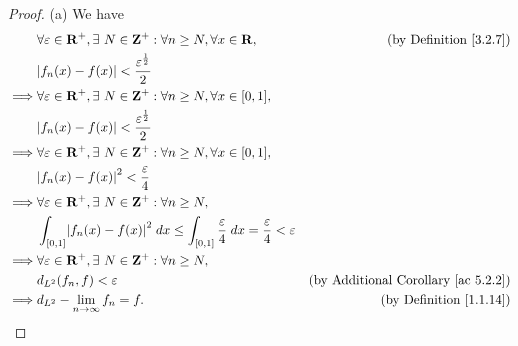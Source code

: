 \begin{proof}{(a)}
    We have
    \begin{align*}
                 & \forall \varepsilon \in \mathbf{R}^+, \exists\ N \in \mathbf{Z}^+ : \forall n \geq N, \forall x \in \mathbf{R},                 & \text{(by Definition \ref{3.2.7})}              \\
                 & \abs*{f_n(x) - f(x)} < \frac{\varepsilon^{\frac{1}{2}}}{2}                                                                                                                        \\
        \implies & \forall \varepsilon \in \mathbf{R}^+, \exists\ N \in \mathbf{Z}^+ : \forall n \geq N, \forall x \in [0, 1],                                                                       \\
                 & \abs*{f_n(x) - f(x)} < \frac{\varepsilon^{\frac{1}{2}}}{2}                                                                                                                        \\
        \implies & \forall \varepsilon \in \mathbf{R}^+, \exists\ N \in \mathbf{Z}^+ : \forall n \geq N, \forall x \in [0, 1],                                                                       \\
                 & \abs*{f_n(x) - f(x)}^2 < \frac{\varepsilon}{4}                                                                                                                                    \\
        \implies & \forall \varepsilon \in \mathbf{R}^+, \exists\ N \in \mathbf{Z}^+ : \forall n \geq N,                                                                                             \\
                 & \int_{[0, 1]} \abs*{f_n(x) - f(x)}^2 \; dx \leq \int_{[0, 1]} \frac{\varepsilon}{4} \; dx = \frac{\varepsilon}{4} < \varepsilon                                                   \\
        \implies & \forall \varepsilon \in \mathbf{R}^+, \exists\ N \in \mathbf{Z}^+ : \forall n \geq N,                                                                                             \\
                 & d_{L^2}(f_n, f) < \varepsilon                                                                                                   & \text{(by Additional Corollary \ref{ac 5.2.2})} \\
        \implies & d_{L^2} - \lim_{n \to \infty} f_n = f.                                                                                          & \text{(by Definition \ref{1.1.14})}
    \end{align*}
\end{proof}

